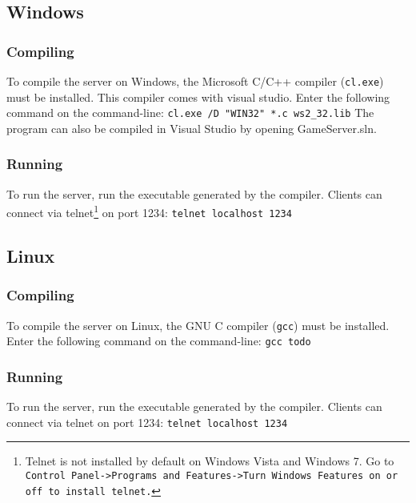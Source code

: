 \documentclass{article}
\begin{document}
\subsection{Windows}

\subsubsection*{Compiling}
To compile the server on Windows, the Microsoft C/C++ compiler (\texttt{cl.exe}) must be installed. This compiler comes with visual studio. Enter the following command on the command-line:\newline\newline
\texttt{cl.exe /D "WIN32" *.c ws2\_32.lib}\newline\newline
The program can also be compiled in Visual Studio by opening GameServer.sln.
\subsubsection*{Running}
To run the server, run the executable generated by the compiler. Clients can connect via telnet\footnote{Telnet is not installed by default on Windows Vista and Windows 7. Go to \texttt{Control Panel->Programs and Features->Turn Windows Features on or off to install telnet.}} on port 1234:
\newline\newline
\texttt{telnet localhost 1234}

\subsection{Linux}

\subsubsection*{Compiling}
To compile the server on Linux, the GNU C compiler (\texttt{gcc}) must be installed. Enter the following command on the command-line:\newline\newline
\texttt{gcc todo}
\subsubsection*{Running}
To run the server, run the executable generated by the compiler. Clients can connect via telnet on port 1234:\newline\newline
\texttt{telnet localhost 1234}
\end{document}
